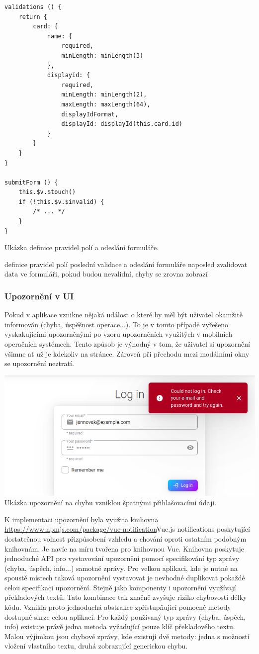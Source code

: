 		\begin{lstlisting}
validations () {
	return {
		card: {
			name: {
				required,
				minLength: minLength(3)
			},
			displayId: {
				required,
				minLength: minLength(2),
				maxLength: maxLength(64),
				displayIdFormat,
				displayId: displayId(this.card.id)
			}
		}
	}
}

submitForm () {
	this.$v.$touch()
	if (!this.$v.$invalid) {
		/* ... */
	}
}
		\end{lstlisting}
		Ukázka definice pravidel polí a odeslání formuláře. %

		definice pravidel polí
		poslední validace a odeslání formuláře
		naposled zvalidovat data ve formuláři, pokud budou nevalidní, chyby se zrovna zobrazí

		\subsubsection{Upozornění v UI}

		Pokud v aplikace vznikne nějaká událost o které by měl být uživatel okamžitě informován (chyba, úspěšnost operace...).
		To je v tomto případě vyřešeno vyskakujícími upozorněnými po vzoru upozorněních využitých v mobilních operačních
		systémech.
		Tento způsob je výhodný v tom, že uživatel si upozornění všimne ať už je kdekoliv na stránce.
		Zároveň při přechodu mezi modálními okny se upozornění neztratí.

		\includegraphics{obrazky/upozorneni_chyba}\hfill
		Ukázka upozornění na chybu vzniklou špatnými přihlašovacími údaji. %

		K implementaci upozornění byla využita knihovna \url{https://www.npmjs.com/package/vue-notification}{Vue.js notifications}
		poskytující dostatečnou volnost přizpůsobení vzhledu a chování oproti ostatním podobným knihovnám.
		Je navíc na míru tvořena pro knihovnou Vue.
		Knihovna poskytuje jednoduché \ac{API} pro vystavování upozornění pomocí specifikování typ zprávy (chyba, úspěch, info...)
		samotné zprávy.
		Pro velkou aplikaci, kde je nutné na spoustě místech taková upozornění vystavovat je nevhodné duplikovat
		pokaždé celou specifikaci upozornění.
		Stejně jako komponenty i upozornění využívají překladových textů.
		Tato kombinace tak značně zvyšuje riziko chybovosti délky kódu.
		Vznikla proto jednoduchá abstrakce zpřístupňující pomocné metody dostupné skrze celou aplikaci.
		Pro každý používaný typ zprávy (chyba, úspěch, info) existuje právě jedna metoda vyžadující pouze klíč překladového textu.
		Malou výjimkou jsou chybové zprávy, kde existují dvě metody: jedna s možností vložení vlastního textu, druhá
		zobrazující generickou chybu.

